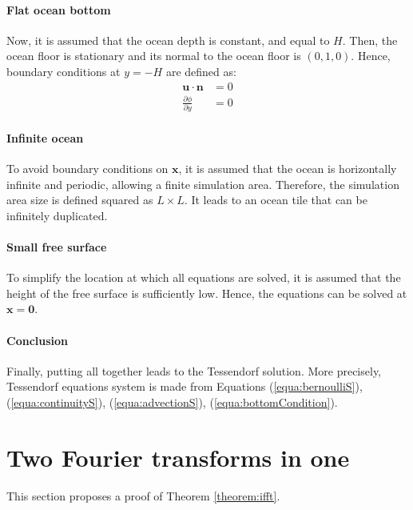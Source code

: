 \documentclass[11pt]{article}
\begin{document}
\paragraph{Flat ocean bottom}
Now, it is assumed that the ocean depth is constant, and equal to $H$.
Then, the ocean floor is stationary and its normal to the ocean floor is $(0,1,0)$.
Hence, boundary conditions at $y=-H$ are defined as:
\begin{equation}
	\begin{aligned}
		\mathbf{u}\cdot\mathbf{n}        & = 0 \\
		\frac{\partial \phi}{\partial y} & = 0
	\end{aligned}
	\label{equa:bottomCondition}
\end{equation}

\paragraph{Infinite ocean}
To avoid boundary conditions on $\mathbf x$, it is assumed that the ocean is horizontally infinite and periodic, allowing a finite simulation area.
Therefore, the simulation area size is defined squared as $L \times L$.
It leads to an ocean tile that can be infinitely duplicated.

\paragraph{Small free surface}
To simplify the location at which all equations are solved, it is assumed that the height of the free surface is sufficiently low. Hence, the equations can be solved at $\mathbf x=\mathbf0$.

\paragraph{Conclusion}
Finally, putting all together leads to the Tessendorf solution.
More precisely, Tessendorf equations system is made from Equations (\ref{equa:bernoulliS}), (\ref{equa:continuityS}), (\ref{equa:advectionS}), (\ref{equa:bottomCondition}).


\section{Two Fourier transforms in one}
\label{sec:annexe-2IFFT}
This section proposes a proof of Theorem \ref{theorem:ifft}.
\end{document}
